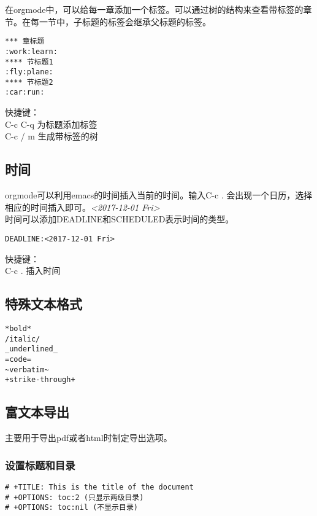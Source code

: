 \documentclass[11pt]{article}
\begin{document}
在orgmode中，可以给每一章添加一个标签。可以通过树的结构来查看带标签的章节。在每一节中，子标题的标签会继承父标题的标签。
\begin{verbatim}
*** 章标题                                                       :work:learn:
**** 节标题1                                                      :fly:plane:
**** 节标题2                                                        :car:run:
\end{verbatim}
快捷键：\\
C-c C-q 为标题添加标签 \\
C-c / m 生成带标签的树 \\

\subsection{时间}
\label{sec-2-2}

orgmode可以利用emacs的时间插入当前的时间。输入C-c . 会出现一个日历，选择相应的时间插入即可。\textit{<2017-12-01 Fri>} \\
时间可以添加DEADLINE和SCHEDULED表示时间的类型。
\begin{verbatim}
DEADLINE:<2017-12-01 Fri>
\end{verbatim}
快捷键： \\
C-c . 插入时间 \\

\subsection{特殊文本格式}
\label{sec-2-3}

\begin{verbatim}
*bold*
/italic/
_underlined_
=code=
~verbatim~
+strike-through+
\end{verbatim}

\subsection{富文本导出}
\label{sec-2-4}

主要用于导出pdf或者html时制定导出选项。 \\

\subsubsection{设置标题和目录}
\label{sec-2-4-1}

\begin{verbatim}
# +TITLE: This is the title of the document
# +OPTIONS: toc:2 (只显示两级目录)
# +OPTIONS: toc:nil (不显示目录)
\end{verbatim}
\end{document}
